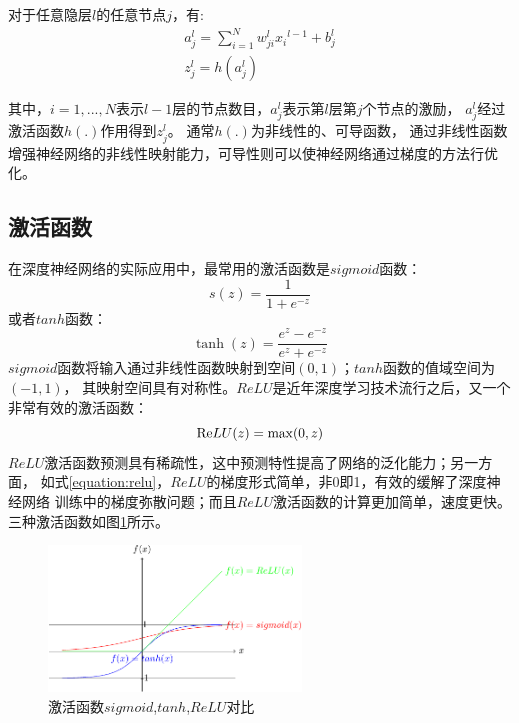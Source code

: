对于任意隐层$l$的任意节点$j$，有:
\[\begin{array}{l}
a_j^l = \sum\limits_{i = 1}^N {w_{ji}^l {x_i}^{l-1}+ b_j^l} \\
z_j^l = h(a_j^l)
\end{array}\]

其中，$i = 1,...,N$表示$l-1$层的节点数目，$a_j^l$表示第$l$层第$j$个节点的激励，
$a_j^l$经过激活函数$h(.)$作用得到$z_j^l$。
通常$h(.)$为非线性的、可导函数，
通过非线性函数增强神经网络的非线性映射能力，可导性则可以使神经网络通过梯度的方法行优化。

\subsection{激活函数}

在深度神经网络的实际应用中，最常用的激活函数是$sigmoid$函数：
\begin{equation}
s(z) = \frac{1}{{1 + {e^{ - z}}}}
\end{equation}
或者$tanh$函数：
\begin{equation}
\tanh (z) = \frac{{{e^z} - {e^{ - z}}}}{{{e^z} + {e^{ - z}}}}
\end{equation}
$sigmoid$函数将输入通过非线性函数映射到空间$(0,1)$；$tanh$函数的值域空间为$(-1,1)$，
其映射空间具有对称性。$ReLU$是近年深度学习技术流行之后，又一个非常有效的激活函数：
\begin{equation} \label{equation:relu}
{\mathop{\rm Re}\nolimits} LU(z) = \max (0,z)
\end{equation}
$ReLU$激活函数预测具有稀疏性，这中预测特性提高了网络的泛化能力；另一方面，
如式\ref{equation:relu}，$ReLU$的梯度形式简单，非0即1，有效的缓解了深度神经网络
训练中的梯度弥散问题；而且$ReLU$激活函数的计算更加简单，速度更快。
三种激活函数如图\ref{fig:activation}所示。

\begin{figure}
\centering
\includegraphics[width=0.6\textwidth]{figures/chapter3/activation-crop}
\caption{激活函数$sigmoid$,$tanh$,$ReLU$对比}
\label{fig:activation}
\end{figure}

